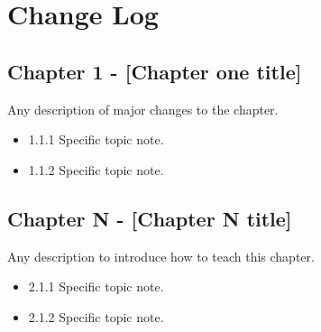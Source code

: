 \documentclass[../workbook]{subfiles}
\begin{document}

\section*{Change Log}


\subsection*{Chapter 1 - [Chapter one title]}

\par{
    Any description of major changes to the chapter.
}


\begin{itemize}
    \item 1.1.1 Specific topic note.
    \item 1.1.2 Specific topic note.
\end{itemize}


\subsection*{Chapter N - [Chapter N title]}

\par{
    Any description to introduce how to teach this chapter.
}


\begin{itemize}
    \item 2.1.1 Specific topic note.
    \item 2.1.2 Specific topic note.
\end{itemize}
\end{document}
